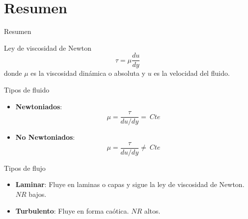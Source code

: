\documentclass [xcolor=svgnames, t] {beamer}
\begin{document}
\section{Resumen}
\begin{frame}{Resumen}
\footnotesize
\begin{block}{Ley de viscosidad de Newton}
$$
\tau = \mu \frac{du}{dy}
$$
donde $\mu$ es la viscosidad din\'amica o absoluta y $u$ es la velocidad del fluido.
\end{block}
\begin{block}{Tipos de fluido}
\begin{itemize}
\item \textbf{Newtoniados}: $$\mu = \frac{\tau}{du/dy} =\ Cte $$
\item \textbf{No Newtoniados}: $$\mu = \frac{\tau}{du/dy} \ne\ Cte $$
\end{itemize}
\end{block}
\begin{block}{Tipos de flujo}
\begin{itemize}
\item \textbf{Laminar}: Fluye en laminas o capas y sigue la ley de viscosidad de Newton. $NR$ bajos.
\item \textbf{Turbulento}: Fluye en forma ca\'otica. $NR$ altos.
\end{itemize}
\end{block}
\end{frame}
\end{document}
